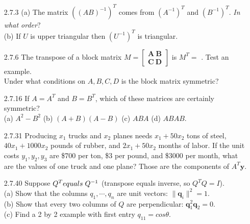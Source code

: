 \documentclass[10pt,twoside,reqno]{article}
\begin{document}
\begin{enumerate}
\item[2.7.3] (a) The matrix $((AB)^{-1})^T$ comes from $(A^{-1})^T$ and $(B^{-1})^T$. \textit{In what order}?\\
(b) If $U$ is upper triangular then $(U^{-1})^T$ is \underline{\hspace{6mm}} triangular.\\
\item[2.7.6] The transpose of a block matrix $M = \left[\begin{smallmatrix} \pmb{A}\ \pmb{B} \\ \pmb{C}\ \pmb{D} \end{smallmatrix} \right]$ is $M^T =$ \underline{\hspace{6mm}}. Test an example.\\
Under what conditions on $A, B, C, D$ is the block matrix symmetric?\\
\item[2.7.16] If $A = A^{T}$ and $B = B^{T}$, which of these matrices are certainly symmetric?\\
(a) $A^2 - B^2$ \hspace{10mm} (b) $(A + B)(A - B)$ \hspace{10mm} (c) $ABA$ \hspace{10mm} (d) $ABAB$.\\
\item[2.7.31] Producing $x_1$ trucks and $x_2$ planes needs $ x_1 + 50x_2$ tons of steel, $40x_1 + 1000x_2$ pounds of rubber, and $2x_1 + 50x_2$ months of labor. If the unit costs $y_1, y_2, y_3$ are \$700 per ton, \$3 per pound, and \$3000 per month, what are the values of one truck and one plane? Those are the components of $A^T\pmb{y}$.\\
\item[2.7.40] Suppose $Q^T equals \hspace{1mm} Q^{-1}$ (transpose equals inverse, so $Q^TQ = I$).\\
(a) Show that the columns $q_1, \cdots, q_n$ are unit vectors: $\lVert \pmb{q}_i \rVert^2 = 1$.\\
(b) Show that every two columns of $Q$ are perpendicular: $\pmb{q}_1^2\pmb{q}_2 = 0$.\\
(c) Find a 2 by 2 example with first entry $q_{11} = cos\theta$.\\
\end{enumerate}
\end{document}
